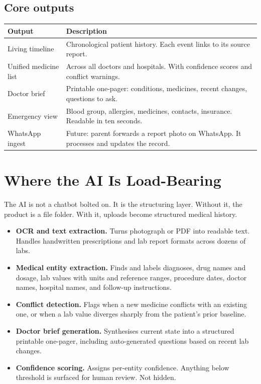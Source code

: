 \documentclass[11pt, a4paper]{article}
\begin{document}
\vspace{6pt}
\subsection{Core outputs}

\vspace{4pt}
\begin{tabularx}{\linewidth}{@{}L{3.0cm} X@{}}
\toprule
\textbf{Output} & \textbf{Description} \\
\midrule
Living timeline & Chronological patient history. Each event links to its source report. \\
Unified medicine list & Across all doctors and hospitals. With confidence scores and conflict warnings. \\
Doctor brief & Printable one-pager: conditions, medicines, recent changes, questions to ask. \\
Emergency view & Blood group, allergies, medicines, contacts, insurance. Readable in ten seconds. \\
WhatsApp ingest & Future: parent forwards a report photo on WhatsApp. It processes and updates the record. \\
\bottomrule
\end{tabularx}

\section{Where the AI Is Load-Bearing}

The AI is not a chatbot bolted on. It is the structuring layer. Without it, the product is a file folder. With it, uploads become structured medical history.

\begin{itemize}
  \item \textbf{OCR and text extraction.} Turns photograph or PDF into readable text. Handles handwritten prescriptions and lab report formats across dozens of labs.
  \item \textbf{Medical entity extraction.} Finds and labels diagnoses, drug names and dosage, lab values with units and reference ranges, procedure dates, doctor names, hospital names, and follow-up instructions.
  \item \textbf{Conflict detection.} Flags when a new medicine conflicts with an existing one, or when a lab value diverges sharply from the patient's prior baseline.
  \item \textbf{Doctor brief generation.} Synthesises current state into a structured printable one-pager, including auto-generated questions based on recent lab changes.
  \item \textbf{Confidence scoring.} Assigns per-entity confidence. Anything below threshold is surfaced for human review. Not hidden.
\end{itemize}
\end{document}
